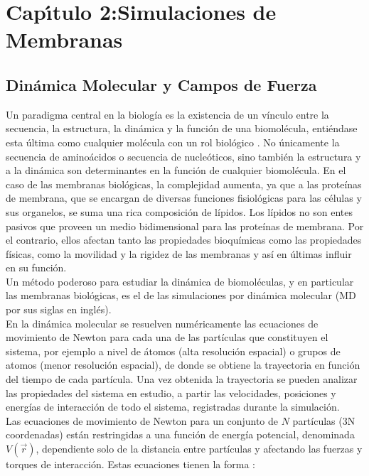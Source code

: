 \chapter{Cap\'{\i}tulo 2:Simulaciones de Membranas}
\section{Din\'{a}mica Molecular y Campos de Fuerza}\label{ss:md} 
Un paradigma central en la biolog\'{i}a es la existencia de un v\'{i}nculo entre la secuencia, la estructura, la din\'{a}mica y la funci\'{o}n de una biomol\'{e}cula, enti\'{e}ndase esta \'{u}ltima como cualquier mol\'{e}cula con un rol biol\'{o}gico \cite{Cui2006}. No \'{u}nicamente la secuencia de amino\'{a}cidos o secuencia de nucle\'{o}ticos, sino tambi\'{e}n la estructura y a la din\'{a}mica son determinantes en la funci\'{o}n de cualquier biomol\'{e}cula. En el caso de las membranas biol\'{o}gicas, la complejidad aumenta, ya que a las prote\'{i}nas de membrana, que se encargan de diversas funciones fisiol\'{o}gicas para las c\'{e}lulas y sus organelos, se suma una rica composici\'{o}n de l\'{i}pidos. Los l\'{i}pidos no son entes pasivos que proveen un medio bidimensional para las prote\'{i}nas de membrana. Por el contrario, ellos afectan tanto las propiedades bioqu\'{i}micas como las propiedades f\'{i}sicas, como la movilidad y la rigidez de las membranas y as\'{i} en \'{u}ltimas influir en su funci\'{o}n.\\

Un m\'{e}todo poderoso para estudiar la din\'{a}mica de biomol\'{e}culas, y en particular las membranas biol\'{o}gicas, es el de las simulaciones por din\'{a}mica molecular (MD por sus siglas en ingl\'{e}s).\\

En la din\'{a}mica molecular se resuelven num\'{e}ricamente las ecuaciones de movimiento de Newton para cada una de las part\'{i}culas que constituyen el sistema, por ejemplo a nivel de \'{a}tomos (alta resoluci\'{o}n espacial) o grupos de atomos (menor resoluci\'{o}n espacial), de donde se obtiene la trayectoria en funci\'{o}n del tiempo de cada part\'{i}cula. Una vez obtenida la trayectoria se pueden analizar las propiedades del sistema en estudio, a partir las velocidades, posiciones y energ\'{i}as de interacci\'{o}n de todo el sistema, registradas durante la simulaci\'{o}n.\\

Las ecuaciones de movimiento de Newton para un conjunto de $N$ part\'{i}culas (3N coordenadas) est\'{a}n restringidas a una funci\'{o}n de energ\'{i}a potencial, denominada $V(\vec{r})$, dependiente solo de la distancia entre part\'{i}culas y afectando las fuerzas y torques de interacci\'{o}n. Estas ecuaciones tienen la forma \cite{Goldstein2001}:

